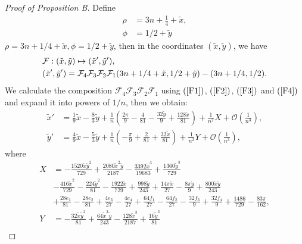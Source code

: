 \documentclass{article}
\numberwithin{figure}{section}
\numberwithin{equation}{section}
\theoremstyle{remark}
\theoremstyle{definition}
\begin{document}
\begin{proof}[Proof of Proposition B]
   Define 
   \begin{equation}\label{rhophitoxy}
   \begin{split}
        \rho&=3n+\frac{1}{4}+\tilde{x},\\
        \phi&=1/2+\tilde{y}
        \end{split}
   \end{equation}
   $\rho=3n+1/4+\tilde{x},\phi=1/2+\tilde{y}$, then in the coordinates $(\tilde{x},\tilde{y})$, we have
   \begin{align}
   &\mathcal{F}:(\tilde{x},\tilde{y})\mapsto(\tilde{x}',\tilde{y}'),\notag\\
   &(\tilde{x}',\tilde{y}')=\mathcal{F}_4\mathcal{F}_3\mathcal{F}_2\mathcal{F}_1(3n+1/4+\tilde{x},1/2+\tilde{y})-(3n+1/4,1/2).
   \end{align}
   We calculate the composition $\mathcal{F}_4\mathcal{F}_3\mathcal{F}_2\mathcal{F}_1$ using $(\ref{F1})$, $(\ref{F2})$, $(\ref{F3})$ and $(\ref{F4})$ and expand it into powers of $1/n$, then we obtain:
   \begin{equation}\label{Ultimate1}
   \begin{split}
       \tilde{x}'&=\frac{1}{9}\tilde{x}-\frac{8}{3}\tilde{y}+\frac{1}{n}\left(\frac{2\pi }{9}-\frac{4}{81}-\frac{32\tilde{y}}{9}+\frac{128\tilde{x}}{81}\right)+\frac{1}{n^2}X+\mathcal{O}\left(\frac{1}{n^3}\right),\\
       \tilde{y}'&=\frac{4}{9}\tilde{x}-\frac{5}{3}\tilde{y}+\frac{1}{n}\left(-\frac{\pi }{9}+\frac{2}{81}+\frac{32\tilde{x}}{81}\right)+\frac{1}{n^2}Y+\mathcal{O}\left(\frac{1}{n^3}\right),
       \end{split}
   \end{equation}
   where 
    \begin{equation}
   \begin{split}
       X&=-\frac{1520\tilde{x}\tilde{y}^2 }{729}+\frac{2080\tilde{x}^2 \tilde{y}}{2187}-\frac{3392\tilde{x}^3 }{19683}+\frac{1360\tilde{y}^3 }{729}\\
       &-\frac{416\tilde{x}^2 }{729}-\frac{224\tilde{y}^2 }{81}-\frac{1922\tilde{x}}{729}+\frac{998\tilde{y}}{243}+\frac{14\pi \tilde{x}}{27}-\frac{8\pi \tilde{y}}{9}+\frac{800\tilde{x}\tilde{y}}{243}\\
&+\frac{28e_1 }{81}-\frac{28e_2 }{81}+\frac{4e_3 }{27}-\frac{4e_4 }{27}+\frac{64f_1 }{27}-\frac{64f_2 }{27}-\frac{32f_3 }{9}+\frac{32f_4 }{9}+\frac{1486}{729}-\frac{83\pi }{162},\\ 
       Y&=-\frac{32\tilde{x}\tilde{y}^2 }{81}+\frac{64\tilde{x}^2 \tilde{y}}{243}-\frac{128\tilde{x}^3 }{2187}+\frac{16\tilde{y}^3 }{81}\\

\end{split}
\end{equation}
\end{proof}
\end{document}
